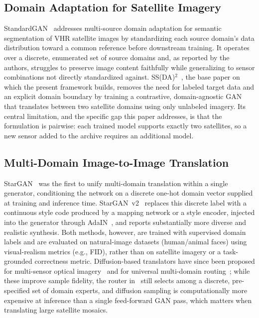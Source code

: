 \documentclass[runningheads]{llncs}
\begin{document}
\subsection{Domain Adaptation for Satellite Imagery}
StandardGAN~\cite{tasar2020standardgan} addresses multi-source domain adaptation for semantic segmentation of VHR satellite images by standardizing each source domain's data distribution toward a common reference before downstream training. It operates over a discrete, enumerated set of source domains and, as reported by the authors, struggles to preserve image content faithfully while generalizing to sensor combinations not directly standardized against. SS(DA)$^2$~\cite{zhang2023ssdada}, the base paper on which the present framework builds, removes the need for labeled target data and an explicit domain boundary by training a contrastive, domain-agnostic GAN that translates between two satellite domains using only unlabeled imagery. Its central limitation, and the specific gap this paper addresses, is that the formulation is pairwise: each trained model supports exactly two satellites, so a new sensor added to the archive requires an additional model.

\subsection{Multi-Domain Image-to-Image Translation}
StarGAN~\cite{choi2018stargan} was the first to unify multi-domain translation within a single generator, conditioning the network on a discrete one-hot domain vector supplied at training and inference time. StarGAN~v2~\cite{choi2020starganv2} replaces this discrete label with a continuous style code produced by a mapping network or a style encoder, injected into the generator through AdaIN~\cite{huang2017adain}, and reports substantially more diverse and realistic synthesis. Both methods, however, are trained with supervised domain labels and are evaluated on natural-image datasets (human/animal faces) using visual-realism metrics (e.g., FID), rather than on satellite imagery or a task-grounded correctness metric. Diffusion-based translators have since been proposed for multi-sensor optical imagery~\cite{vinholi2024multisensor} and for universal multi-domain routing~\cite{kieu2025universal}; while these improve sample fidelity, the router in~\cite{kieu2025universal} still selects among a discrete, pre-specified set of domain experts, and diffusion sampling is computationally more expensive at inference than a single feed-forward GAN pass, which matters when translating large satellite mosaics.
\end{document}
